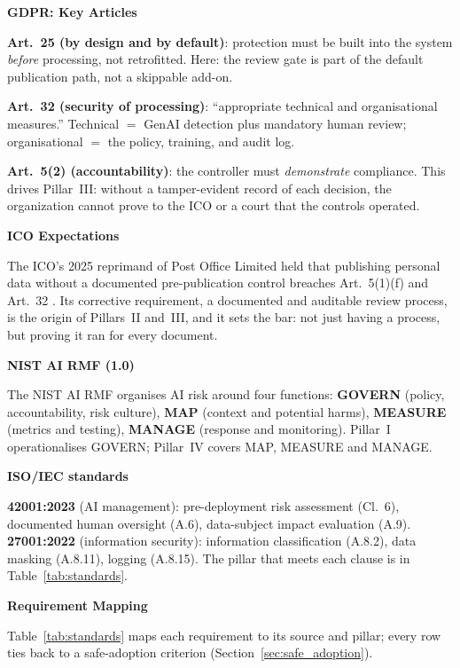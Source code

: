 \documentclass[12pt,a4paper]{article}
\begin{document}
\noindent\textbf{GDPR: Key Articles}\par

\textbf{Art.~25 (by design and by default)}: protection must be built into the system \emph{before} processing, not retrofitted. Here: the review gate is part of the default publication path, not a skippable add-on.

\textbf{Art.~32 (security of processing)}: ``appropriate technical and organisational measures.'' Technical $=$ GenAI detection plus mandatory human review; organisational $=$ the policy, training, and audit log.

\textbf{Art.~5(2) (accountability)}: the controller must \emph{demonstrate} compliance. This drives Pillar~III: without a tamper-evident record of each decision, the organization cannot prove to the ICO or a court that the controls operated.

\noindent\textbf{ICO Expectations}\par

The ICO's 2025 reprimand of Post Office Limited held that publishing personal data without a documented pre-publication control breaches Art.~5(1)(f) and Art.~32 \cite{ico2025}. Its corrective requirement, a documented and auditable review process, is the origin of Pillars~II and~III, and it sets the bar: not just having a process, but proving it ran for every document.

\noindent\textbf{NIST AI RMF (1.0)}\par
The NIST AI RMF \cite{nist_ai_rmf} organises AI risk around four functions: \textbf{GOVERN} (policy, accountability, risk culture), \textbf{MAP} (context and potential harms), \textbf{MEASURE} (metrics and testing), \textbf{MANAGE} (response and monitoring). Pillar~I operationalises GOVERN; Pillar~IV covers MAP, MEASURE and MANAGE.

\noindent\textbf{ISO/IEC standards}\par
\textbf{42001:2023} \cite{iso42001} (AI management): pre-deployment risk assessment (Cl.~6), documented human oversight (A.6), data-subject impact evaluation (A.9). \textbf{27001:2022} \cite{iso27001} (information security): information classification (A.8.2), data masking (A.8.11), logging (A.8.15). The pillar that meets each clause is in Table~\ref{tab:standards}.

\noindent\textbf{Requirement Mapping}\par

Table~\ref{tab:standards} maps each requirement to its source and pillar; every row ties back to a safe-adoption criterion (Section~\ref{sec:safe_adoption}).
\end{document}

